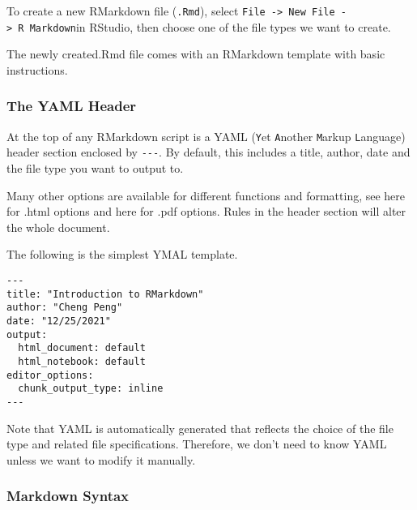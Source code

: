 \documentclass[
]{article}
\begin{document}
To create a new RMarkdown file (\texttt{.Rmd}), select
\texttt{File\ -\textgreater{}\ New\ File\ -\textgreater{}\ R\ Markdown}in
RStudio, then choose one of the file types we want to create.

The newly created.Rmd file comes with an RMarkdown template with basic
instructions.

\hypertarget{the-yaml-header}{%
\subsubsection{The YAML Header}\label{the-yaml-header}}

At the top of any RMarkdown script is a YAML (\texttt{Y}et
\texttt{A}nother \texttt{M}arkup \texttt{L}anguage) header section
enclosed by \texttt{-\/-\/-}. By default, this includes a title, author,
date and the file type you want to output to.

Many other options are available for different functions and formatting,
see here for .html options and here for .pdf options. Rules in the
header section will alter the whole document.

The following is the simplest YMAL template.

\begin{verbatim}
---
title: "Introduction to RMarkdown"
author: "Cheng Peng"
date: "12/25/2021"
output:
  html_document: default
  html_notebook: default
editor_options:
  chunk_output_type: inline
---
\end{verbatim}

Note that YAML is automatically generated that reflects the choice of
the file type and related file specifications. Therefore, we don't need
to know YAML unless we want to modify it manually.

\hypertarget{markdown-syntax}{%
\subsubsection{Markdown Syntax}\label{markdown-syntax}}
\end{document}
